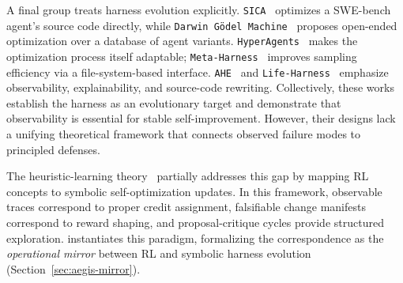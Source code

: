 A final group treats harness evolution explicitly. \texttt{SICA}~\cite{robeyns2025self} optimizes a SWE-bench agent's source code directly, while \texttt{Darwin Gödel Machine}~\cite{lange2025darwin} proposes open-ended optimization over a database of agent variants. \texttt{HyperAgents}~\cite{zhang2026hyperagents} makes the optimization process itself adaptable; \texttt{Meta-Harness}~\cite{lee2026meta} improves sampling efficiency via a file-system-based interface. \texttt{AHE}~\cite{lin2026agentic} and \texttt{Life-Harness}~\cite{xu2026adapting} emphasize observability, explainability, and source-code rewriting. Collectively, these works establish the harness as an evolutionary target and demonstrate that observability is essential for stable self-improvement. However, their designs lack a unifying theoretical framework that connects observed failure modes to principled defenses.

The heuristic-learning theory~\cite{weng2026learning_beyond_gradients} partially addresses this gap by mapping RL concepts to symbolic self-optimization updates. In this framework, observable traces correspond to proper credit assignment, falsifiable change manifests correspond to reward shaping, and proposal-critique cycles provide structured exploration. \ProjectName instantiates this paradigm, formalizing the correspondence as the \textit{operational mirror} between RL and symbolic harness evolution (Section~\ref{sec:aegis-mirror}).